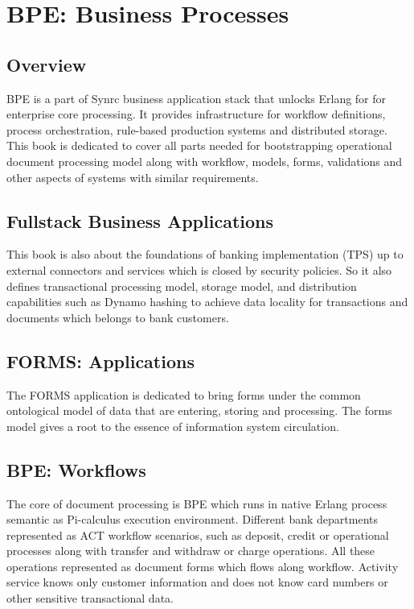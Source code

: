\section{BPE: Business Processes}

\subsection{Overview}
BPE is a part of Synrc business application stack that
unlocks Erlang for for enterprise core processing.
It provides infrastructure for workflow definitions, process orchestration,
rule-based production systems and distributed storage. This book is dedicated to cover
all parts needed for bootstrapping operational document processing model along with
workflow, models, forms, validations and other aspects of systems with similar requirements.

\subsection{Fullstack Business Applications}
This book is also about the foundations of banking implementation (TPS) up to external
connectors and services which is closed by security policies. So it also defines
transactional processing model, storage model, and distribution capabilities such as
Dynamo hashing to achieve data locality for transactions and documents which
belongs to bank customers.

\subsection{FORMS: Applications}
The FORMS application is dedicated to bring forms under the common
ontological model of data that are entering, storing and processing.
The forms model gives a root to the essence of information system circulation.

\subsection{BPE: Workflows}
The core of document processing is BPE which runs in native Erlang process semantic
as Pi-calculus execution environment. Different bank departments represented
as ACT workflow scenarios, such as deposit, credit or operational processes along with
transfer and withdraw or charge operations. All these operations represented
as document forms which flows along workflow. Activity service knows only
customer information and does not know card numbers or other sensitive transactional data.

